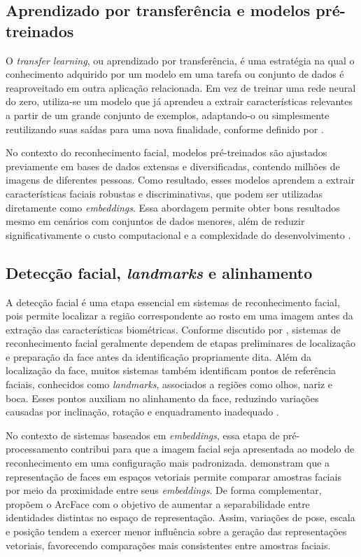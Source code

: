\subsection{Aprendizado por transferência e modelos pré-treinados}

O \textit{transfer learning}, ou aprendizado por transferência, é uma estratégia na qual o conhecimento adquirido por um modelo em uma tarefa ou conjunto de dados é reaproveitado em outra aplicação relacionada. Em vez de treinar uma rede neural do zero, utiliza-se um modelo que já aprendeu a extrair características relevantes a partir de um grande conjunto de exemplos, adaptando-o ou simplesmente reutilizando suas saídas para uma nova finalidade, conforme definido por \textcite{pan2010survey}.

No contexto do reconhecimento facial, modelos pré-treinados são ajustados previamente em bases de dados extensas e diversificadas, contendo milhões de imagens de diferentes pessoas. Como resultado, esses modelos aprendem a extrair características faciais robustas e discriminativas, que podem ser utilizadas diretamente como \textit{embeddings}. Essa abordagem permite obter bons resultados mesmo em cenários com conjuntos de dados menores, além de reduzir significativamente o custo computacional e a complexidade do desenvolvimento \cite{schroff2015facenet}.

\subsection{Detecção facial, \textit{landmarks} e alinhamento}

A detecção facial é uma etapa essencial em sistemas de reconhecimento facial, pois permite localizar a região correspondente ao rosto em uma imagem antes da extração das características biométricas. Conforme discutido por \textcite{zhao2003face}, sistemas de reconhecimento facial geralmente dependem de etapas preliminares de localização e preparação da face antes da identificação propriamente dita. Além da localização da face, muitos sistemas também identificam pontos de referência faciais, conhecidos como \textit{landmarks}, associados a regiões como olhos, nariz e boca. Esses pontos auxiliam no alinhamento da face, reduzindo variações causadas por inclinação, rotação e enquadramento inadequado \cite{hassaballah2015face}.

No contexto de sistemas baseados em \textit{embeddings}, essa etapa de pré-processamento contribui para que a imagem facial seja apresentada ao modelo de reconhecimento em uma configuração mais padronizada. \textcite{schroff2015facenet} demonstram que a representação de faces em espaços vetoriais permite comparar amostras faciais por meio da proximidade entre seus \textit{embeddings}. De forma complementar, \textcite{deng2019arcface} propõem o ArcFace com o objetivo de aumentar a separabilidade entre identidades distintas no espaço de representação. Assim, variações de pose, escala e posição tendem a exercer menor influência sobre a geração das representações vetoriais, favorecendo comparações mais consistentes entre amostras faciais.

